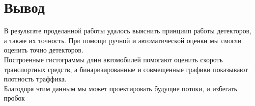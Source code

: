 \documentclass[a4paper,12pt]{article}
\begin{document}
\newpage
\section*{Вывод}
В результате проделанной работы удалось выяснить принциип работы детекторов, а также их точность.
При помощи ручной и автоматической оценки мы смогли оценить точно детекторов.\\
Построенные гистограммы длин автомобилей помогают оценить скороть транспортных средств,
а бинаризированные и совмещенные графики показывают плотность траффика.\\
Благодоря этим данным мы может проектировать будущие потоки, и избегать пробок
\newpage
\end{document}
